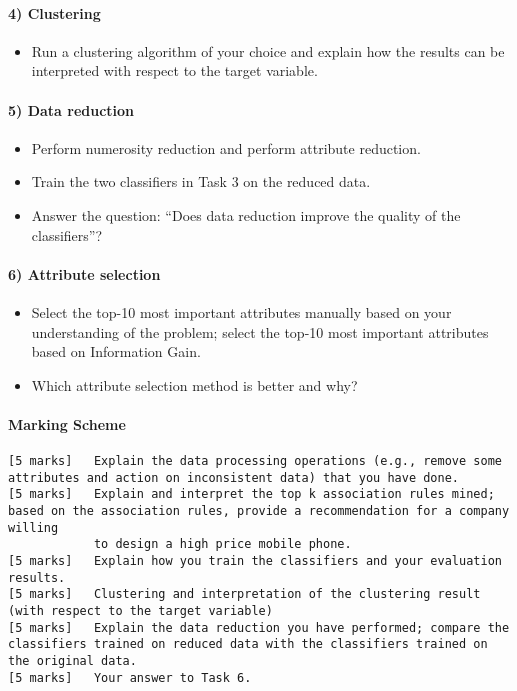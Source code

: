 \documentclass[11pt]{article}
\providecommand{\tightlist}{%
      \setlength{\itemsep}{0pt}\setlength{\parskip}{0pt}}
\begin{document}
\hypertarget{clustering}{%
\paragraph{4) Clustering}\label{clustering}}

\begin{itemize}
\tightlist
\item
  Run a clustering algorithm of your choice and explain how the results
  can be interpreted with respect to the target variable.
\end{itemize}

\hypertarget{data-reduction}{%
\paragraph{5) Data reduction}\label{data-reduction}}

\begin{itemize}
\tightlist
\item
  Perform numerosity reduction and perform attribute reduction.
\item
  Train the two classifiers in Task 3 on the reduced data.
\item
  Answer the question: ``Does data reduction improve the quality of the
  classifiers''?
\end{itemize}

\hypertarget{attribute-selection}{%
\paragraph{6) Attribute selection}\label{attribute-selection}}

\begin{itemize}
\tightlist
\item
  Select the top-10 most important attributes manually based on your
  understanding of the problem; select the top-10 most important
  attributes based on Information Gain.
\item
  Which attribute selection method is better and why?
\end{itemize}

\hypertarget{marking-scheme}{%
\paragraph{\texorpdfstring{\textbf{Marking
Scheme}}{Marking Scheme}}\label{marking-scheme}}

\begin{verbatim}
[5 marks]   Explain the data processing operations (e.g., remove some attributes and action on inconsistent data) that you have done.
[5 marks]   Explain and interpret the top k association rules mined; based on the association rules, provide a recommendation for a company willing 
            to design a high price mobile phone.
[5 marks]   Explain how you train the classifiers and your evaluation results.
[5 marks]   Clustering and interpretation of the clustering result (with respect to the target variable)
[5 marks]   Explain the data reduction you have performed; compare the classifiers trained on reduced data with the classifiers trained on the original data.
[5 marks]   Your answer to Task 6.
\end{verbatim}
\end{document}
